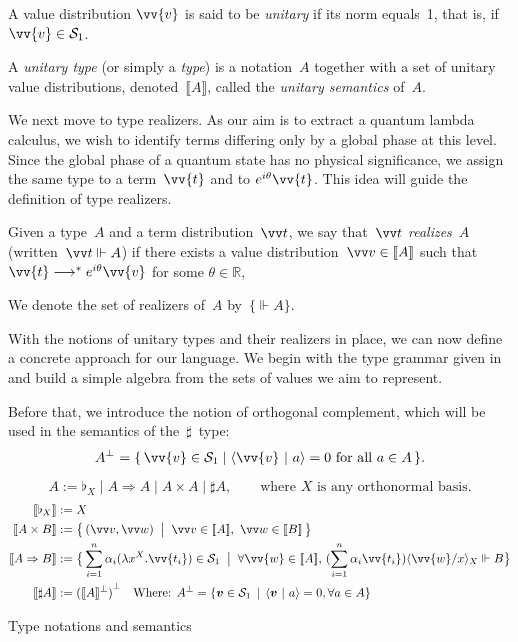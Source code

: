 \documentclass[runningheads,orivec,envcountsame,envcountsect]{llncs}
\newcommand\comp[2][]{#2^{\bot^{#1}}}
\newcommand\lra{\longrightarrow}
\newcommand\ansubst[2]{\ensuremath{\langle #1 \rangle_{#2}}}
\def\R{\mathbb{R}}            %
\def\Sph{\mathcal{S}_1}       %
\def\scal#1#2{\langle{#1}~|~{#2}\rangle}
\def\Lam#1#2#3{\lambda#1^{#2}{.}#3} %
\def\eval{\lra^*}
\def\Arr{\Rightarrow}
\def\sem#1{\llbracket#1\rrbracket}
\def\real{\Vdash}
\newcommand\basis[1]{\ensuremath{\flat_{#1}}}
\begin{document}
\begin{definition}
  A value distribution $\vv{v}$ is said to be \emph{unitary} if its norm equals~1,
  that is, if $\vv{v}\in\Sph$.
\end{definition}

\begin{definition}
  A \emph{unitary type} (or simply a \emph{type}) is a notation~$A$ together
  with a set of unitary value distributions, denoted~$\sem{A}$, called the
  \emph{unitary semantics} of~$A$.
\end{definition}


We next move to type realizers. As our aim is to extract a quantum
lambda calculus, we wish to identify terms differing only by a global phase at
this level. Since the global phase of a quantum state has no physical
significance, we assign the same type to a term~$\vv{t}$ and to
$e^{i\theta}\vv{t}$. This idea will guide the definition of type
realizers.

\begin{definition}\label{def:Realizer}
  Given a type~$A$ and a term distribution~$\vv t$, we say that~$\vv t$
  \emph{realizes}~$A$ (written~$\vv t \real A$) if there exists a value
  distribution~$\vv v\in\sem A$ such that
  $\vv{t}\eval e^{i\theta}\vv{v}$ for some $\theta\in\R$,

  We denote the set of realizers of~$A$ by~$\{\real A\}$.
\end{definition}

With the notions of unitary types and their realizers in place, we can now
define a concrete approach for our language. We begin with the type grammar
given in~ and build a simple algebra from the sets of
values we aim to represent.

Before that, we introduce the notion of orthogonal complement, which will be
used in the semantics of the~$\sharp$~type:
\[
  \comp{A} = \{\, \vv{v}\in \Sph \mid \scal{\vv{v}}{a} = 0 \text{ for all } a\in A\,\}.
\]
\begin{table}[t]
  \[
    A := \basis{X} \mid A\Arr A \mid A\times A \mid \sharp A,
    \qquad\text{where $X$ is any orthonormal basis.}
  \]
  \begin{align*}
    \sem{\basis{X}}&:= X\\
    \sem{A\times B}&:= \bigl\{\,(\vv v, \vv w)\;\bigm|\; \vv v\in\sem{A},~\vv w\in\sem{B}\,\bigr\}\\
    \sem{A\Arr B}&:=
    \bigl\{\,\sum_{i=1}^{n}\alpha_i(\Lam{x}{X}{\vv{t_i}})\in\Sph
      \;\bigm|\;
      \forall\vv{w}\in\sem{A},\,
      (\sum_{i=1}^{n}\alpha_i \vv{t_i})\ansubst{\vv{w}/x}{X}\real B
    \bigr\}\\
    \sem{\sharp A}&:= {(\sem{A}^\bot)}^\bot\quad\text{Where: }A^\bot = \{\vec{v}\in\Sph\,\mid\,\scal{\vec{v}}{a} = 0, \forall a\in A\}
  \end{align*}
  \caption{Type notations and semantics}
  \label{tab:UnitaryTypes}
\end{table}
\end{document}
